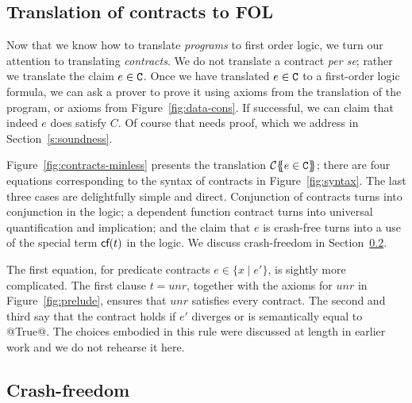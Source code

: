 
\subsection{Translation of contracts to FOL} \label{s:contracts-fol}

Now that we know how to translate \emph{programs} to first order
logic, we turn our attention to translating \emph{contracts}.  We do
not translate a contract \emph{per se}; rather we translate the claim
$e \in {\tt C}$.  Once we have translated $e \in {\tt C}$ to a first-order logic
formula, we can ask a prover to prove it using axioms from the translation of
the program, or axioms from Figure~\ref{fig:data-cons}. If successful, we can
claim that indeed $e$ does satisfy $C$.  Of course that needs proof,
which we address in Section~\ref{s:soundness}.

Figure~\ref{fig:contracts-minless} presents the translation
${\cal C}\{\!\!\{e \in {\tt C}\}\!\!\}$; there are four equations corresponding
to the syntax of contracts in Figure~\ref{fig:syntax}.
The last three cases are delightfully simple and direct.  Conjunction of contracts
turns into conjunction in the logic; a dependent function contract turns
into universal quantification and implication; and the claim that $e$ is
crash-free turns into a use of the special term $\textsf{cf}(t)$ in the logic.
We discuss crash-freedom in Section~\ref{s:cf-fol}.

The first equation, for predicate contracts $e \in \{x \mid e' \}$,
is sightly more complicated.
The first clause $t=unr$, together with the axioms for $unr$ in Figure~\ref{fig:prelude}, ensures
that $unr$ satisfies every contract.
The second and third say that the contract holds if $e'$ diverges or is semantically
equal to @True@.  The choices embodied in this rule were discussed at length
in earlier work \cite{xu+:contracts} and we do not rehearse it here.

\subsection{Crash-freedom} \label{s:cf-fol}


